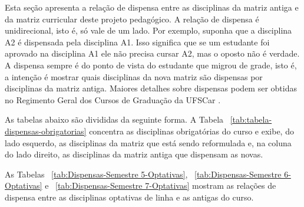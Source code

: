 Esta seção apresenta a relação de dispensa entre as disciplinas da matriz antiga e da matriz curricular deste projeto pedagógico. A relação de dispensa é unidirecional, isto é, só vale de um lado. Por exemplo, suponha que a disciplina A2 é dispensada pela disciplina A1. Isso significa que se um estudante foi aprovado na disciplina A1 ele não precisa cursar A2, mas o oposto não é verdade. A dispensa sempre é do ponto de vista do estudante que migrou de grade, isto é, a intenção é mostrar quais disciplinas da nova matriz são dispensas por disciplinas da matriz antiga. Maiores detalhes sobre dispensas podem ser obtidas no Regimento Geral dos Cursos de Graduação da UFSCar \cite{Regimento-Geral-CursosGraduacao-UFSCar}. 

As tabelas abaixo são divididas da seguinte forma. A Tabela ~\ref{tab:tabela-dispensas-obrigatorias} concentra as disciplinas obrigatórias do curso e exibe, do lado esquerdo, as disciplinas da matriz que está sendo reformulada e, na coluna do lado direito, as disciplinas da matriz antiga que dispensam as novas. 

As Tabelas ~\ref{tab:Dispensas-Semestre 5-Optativas}, ~\ref{tab:Dispensas-Semestre 6-Optativas} e ~\ref{tab:Dispensas-Semestre 7-Optativas} mostram as relações de dispensa entre as disciplinas optativas de linha e as antigas do curso.  

\singlespacing

\setlength{\tabcolsep}{3pt}

